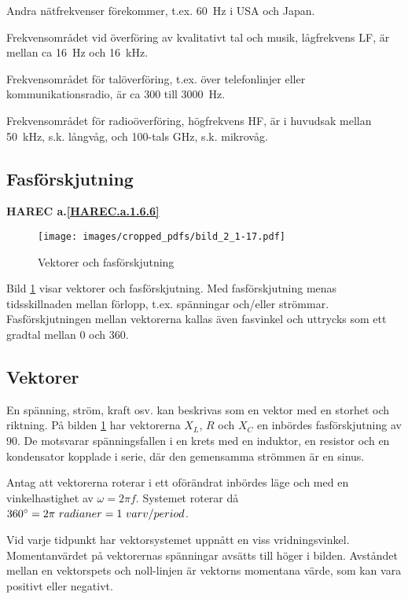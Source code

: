 Andra nätfrekvenser förekommer, t.ex. 60~Hz i USA och Japan.

Frekvensområdet vid överföring av kvalitativt tal och musik, lågfrekvens LF, är
mellan ca 16~Hz och 16~kHz.

Frekvensområdet för talöverföring, t.ex. över telefonlinjer eller
kommunikationsradio, är ca 300 till 3000~Hz.

Frekvensområdet för radioöverföring, högfrekvens HF, är i huvudsak mellan
50~kHz, s.k. långvåg, och 100-tals GHz, s.k. mikrovåg.

\subsection{Fasförskjutning}
\textbf{HAREC a.\ref{HAREC.a.1.6.6}\label{myHAREC.a.1.6.6}}

\begin{figure}[ht]
\texttt{[image: images/cropped\_pdfs/bild\_2\_1-17.pdf]}
\caption{Vektorer och fasförskjutning}
\label{fig:BildII1-17}
\end{figure}

Bild \ref{fig:BildII1-17} visar vektorer och fasförskjutning.
Med fasförskjutning menas tidsskillnaden mellan förlopp, t.ex. spänningar
och/eller strömmar.
Fasförskjutningen mellan vektorerna kallas även fasvinkel och uttrycks som ett
gradtal mellan 0 och 360\degree.

\subsection{Vektorer}

En spänning, ström, kraft osv. kan beskrivas som en vektor med en storhet och
riktning.
På bilden \ref{fig:BildII1-17} har vektorerna \(X_L\), \(R\) och \(X_C\) en
inbördes fasförskjutning av 90\degree.
De motsvarar spänningsfallen i en krets med en induktor, en resistor och en
kondensator kopplade i serie, där den gemensamma strömmen är en sinus.

Antag att vektorerna roterar i ett oförändrat inbördes läge och med en
vinkelhastighet av \(\omega= 2\pi f\).
Systemet roterar då \(360\degree = 2\pi\ radianer = 1\ varv/period\).

Vid varje tidpunkt har vektorsystemet uppnått en viss vridningsvinkel.
Momentanvärdet på vektorernas spänningar avsätts till höger i bilden.
Avståndet mellan en vektorspets och noll-linjen är vektorns momentana värde,
som kan vara positivt eller negativt.
